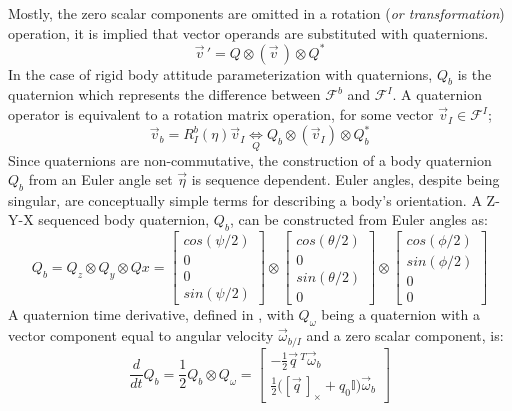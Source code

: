Mostly, the zero scalar components are omitted in a rotation (\emph{or transformation}) operation, it is implied that vector operands are substituted with quaternions.
\begin{equation}\label{eq:quaternion-rotation}
\vec{v}\hspace{2pt}'=Q \otimes (\vec{v}\hspace{2pt}) \otimes Q^*
\end{equation} 
In the case of rigid body attitude parameterization with quaternions, $Q_b$ is the quaternion which represents the difference between $\mathcal{F}^b$ and $\mathcal{F}^I$. A quaternion operator is equivalent to a rotation matrix operation, for some vector $\vec{v}_I\in\mathcal{F}^I$;
\begin{equation}
\vec{v}_b=R_I^b(\eta)\vec{v}_I \underset{Q}{\iff} Q_b \otimes (\vec{v}_I) \otimes Q_b^*
\end{equation}
Since quaternions are non-commutative, the construction of a body quaternion $Q_b$ from an Euler angle set $\vec{\eta}$ is sequence dependent. Euler angles, despite being singular, are conceptually simple terms for describing a body's orientation. A Z-Y-X sequenced body quaternion, $Q_b$, can be constructed from Euler angles as:
\begin{equation}\label{eq:quaternion-sequence}
Q_b=Q_z\otimes Q_y\otimes Qx=\begin{bmatrix}
cos(\psi/2)\\
0\\
0\\
sin(\psi/2)
\end{bmatrix}
\otimes
\begin{bmatrix}
cos(\theta/2)\\
0\\
sin(\theta/2)\\
0
\end{bmatrix}
\otimes
\begin{bmatrix}
cos(\phi/2)\\
sin(\phi/2)\\
0\\
0
\end{bmatrix}
\end{equation}
A quaternion time derivative, defined in \cite{quaterniondynamics}, with $Q_\omega$ being a quaternion with a vector component equal to angular velocity $\vec{\omega}_{b/I}$ and a zero scalar component, is:
\begin{equation}\label{eq:quaternion-deriv}
\frac{d}{dt}Q_b=\frac{1}{2}Q_b\otimes Q_{\omega}=\begin{bmatrix}
-\frac{1}{2}\vec{q}\hspace{2pt}^{T} \vec{\omega}_b\\
\frac{1}{2}\big([\vec{q}\hspace{2pt}]_\times+q_0\mathbb{I}\big)\vec{\omega}_b
\end{bmatrix}
\end{equation}
